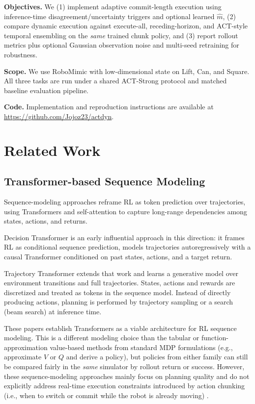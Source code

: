 \documentclass{article}
\begin{document}
\textbf{Objectives.} We (1) implement adaptive commit-length execution using inference-time disagreement/uncertainty triggers and optional learned $\hat{m}$, (2) compare dynamic execution against execute-all, receding-horizon, and ACT-style temporal ensembling on the \emph{same} trained chunk policy, and (3) report rollout metrics plus optional Gaussian observation noise and multi-seed retraining for robustness.

\textbf{Scope.} We use RoboMimic with low-dimensional state on Lift, Can, and Square. All three tasks are run under a shared ACT-Strong protocol and matched baseline evaluation pipeline.

\noindent\textbf{Code.} Implementation and reproduction instructions are available at \url{https://github.com/Jojoz23/actdyn}.


\section{Related Work}
\subsection{Transformer-based Sequence Modeling}

Sequence-modeling approaches reframe RL as token prediction over trajectories, using Transformers and self-attention to capture long-range dependencies among states, actions, and returns.

Decision Transformer \cite{chen2021decisiontransformerreinforcementlearning} is an early influential approach in this direction: it frames RL as conditional sequence prediction, models trajectories autoregressively with a causal Transformer conditioned on past states, actions, and a target return.

Trajectory Transformer \cite{janner2021offlinereinforcementlearningbig} extends that work and learns a generative model over environment transitions and full trajectories. States, actions and rewards are discretized and treated as tokens in the sequence model. Instead of directly producing actions, planning is performed by trajectory sampling or a search (beam search) at inference time.

These papers establish Transformers as a viable architecture for RL sequence modeling. This is a different modeling choice than the tabular or function-approximation value-based methods from standard MDP formulations (e.g., approximate $V$ or $Q$ and derive a policy), but policies from either family can still be compared fairly in the \emph{same} simulator by rollout return or success. However, these sequence-modeling approaches mainly focus on planning quality and do not explicitly address real-time execution constraints introduced by action chunking (i.e., when to switch or commit while the robot is already moving) \cite{real_time_chunking}.
\end{document}
